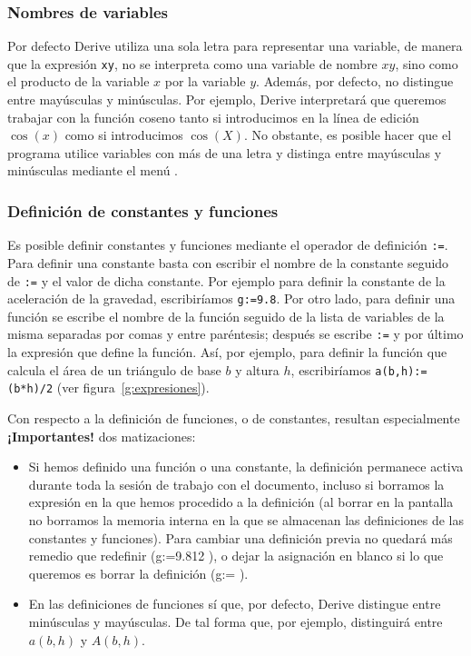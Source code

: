 \subsubsection*{Nombres de variables}
Por defecto Derive utiliza una sola letra para representar una
variable, de manera que la expresión \texttt{xy}, no se interpreta
como una variable de nombre $xy$, sino como el producto de la
variable $x$ por la variable $y$. Además, por defecto, no
distingue entre mayúsculas y minúsculas. Por ejemplo, Derive
interpretará que queremos trabajar con la función coseno tanto si
introducimos en la línea de edición $\cos(x)$ como si introducimos
$\cos(X)$. No obstante, es posible hacer que el programa utilice
variables con más de una letra y distinga entre mayúsculas y
minúsculas mediante el menú .

\subsubsection*{Definición de constantes y funciones}
Es posible definir constantes y funciones mediante el operador de
definición \texttt{:=}. Para definir una constante basta con
escribir el nombre de la constante seguido de \texttt{:=} y el
valor de dicha constante. Por ejemplo para definir la constante de
la aceleración de la gravedad, escribiríamos \texttt{g:=9.8}. Por
otro lado, para definir una función se escribe el nombre de la
función seguido de la lista de variables de la misma separadas por
comas y entre paréntesis; después se escribe \texttt{:=} y por
último la expresión que define la función. Así, por ejemplo, para
definir la función que calcula el área de un triángulo de base $b$
y altura $h$, escribiríamos \texttt{a(b,h):=(b*h)/2} (ver
figura~\ref{g:expresiones}).

Con respecto a la definición de funciones, o de constantes,
resultan especialmente \textbf{¡Importantes!} dos matizaciones:

\begin{itemize}

\item Si hemos definido una función o una constante, la definición
permanece activa durante toda la sesión de trabajo con el
documento, incluso si borramos la expresión en la que hemos
procedido a la definición (al borrar en la pantalla no borramos la
memoria interna en la que se almacenan las definiciones de las
constantes y funciones). Para cambiar una definición previa no
quedará más remedio que redefinir (g:=9.812 ), o dejar la
asignación en blanco si lo que queremos es borrar la definición
(g:= ).

\item En las definiciones de funciones sí que, por defecto, Derive
distingue entre minúsculas y mayúsculas. De tal forma que, por
ejemplo, distinguirá entre $a(b,h)$ y $A(b,h)$.

\end{itemize}

